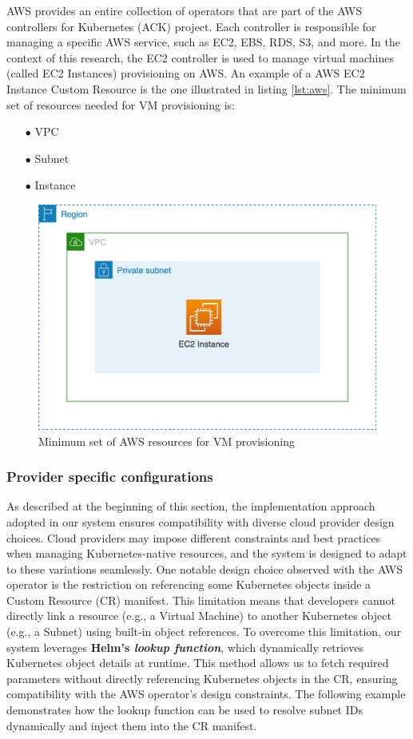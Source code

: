 AWS provides an entire collection of operators that are part of the AWS controllers for Kubernetes (ACK) project.
Each controller is responsible for managing a specific AWS service, such as EC2, EBS, RDS, S3, and more. In the context of this research, the EC2 controller is used to manage virtual machines (called EC2 Instances) provisioning on AWS.
An example of a AWS EC2 Instance Custom Resource is the one illustrated in listing \ref{lst:aws}.
The minimum set of resources needed for VM provisioning is:
\begin{itemize}[itemsep=0.2pt, topsep=1pt] 
\item[$\bullet$] VPC
\item[$\bullet$] Subnet
\item[$\bullet$] Instance
\end{itemize}

\begin{figure}[H]
\centering
\includegraphics[width=0.75\linewidth]{images/aws.png}
\caption{Minimum set of AWS resources for VM provisioning}
\label{fig:aws}
\end{figure}

\subsubsection{Provider specific configurations}

As described at the beginning of this section, the implementation approach adopted in our system ensures compatibility with diverse cloud provider design choices. Cloud providers may impose different constraints and best practices when managing Kubernetes-native resources, and the system is designed to adapt to these variations seamlessly.
One notable design choice observed with the AWS operator is the restriction on referencing some Kubernetes objects inside a Custom Resource (CR) manifest. This limitation means that developers cannot directly link a resource (e.g., a Virtual Machine) to another Kubernetes object (e.g., a Subnet) using built-in object references.
To overcome this limitation, our system leverages \textbf{Helm’s \textit{lookup function}}, which dynamically retrieves Kubernetes object details at runtime. This method allows us to fetch required parameters without directly referencing Kubernetes objects in the CR, ensuring compatibility with the AWS operator’s design constraints. The following example demonstrates how the lookup function can be used to resolve subnet IDs dynamically and inject them into the CR manifest. \newline


